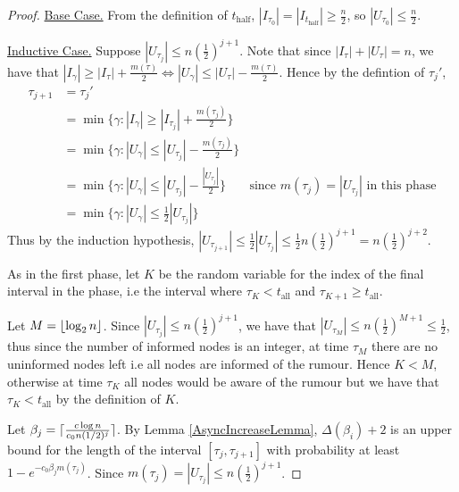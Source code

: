\begin{proof}
	\underline{Base Case.}
	From the definition of $t_\text{half}$, $|I_{\tau_0}| = |I_{t_\text{half}}| \geq \frac{n}{2}$, so $|U_{\tau_0}| \leq \frac{n}{2}$.

	\underline{Inductive Case.} Suppose $|U_{\tau_j}| \leq n(\frac{1}{2})^{j+1}$. Note that since $|I_\tau| + |U_\tau| = n$, we have that $|I_{\gamma}| \geq |I_\tau| + \frac{m(\tau)}{2} \iff |U_\gamma| \leq |U_\tau| - \frac{m(\tau)}{2}$. Hence by the defintion of $\tau_j'$,
	\begin{align*}
		\tau_{j+1} &= \tau_j' \\
		&= \min \{ \gamma : |I_\gamma| \geq |I_{\tau_j}| + \frac{m(\tau_j)}{2}\} \\
		&= \min \{ \gamma : |U_\gamma| \leq |U_{\tau_j}| - \frac{m(\tau_j)}{2}\} \\
		&= \min \{ \gamma : |U_\gamma| \leq |U_{\tau_j}| - \frac{|U_{\tau_j}|}{2}\} & \text{since } m(\tau_j) = |U_{\tau_j}| \text{ in this phase} \\
		&= \min \{ \gamma : |U_\gamma| \leq \frac{1}{2}|U_{\tau_j}|\}
	\end{align*}
	Thus by the induction hypothesis, $|U_{\tau_{j+1}}| \leq \frac{1}{2}|U_{\tau_j}| \leq \frac{1}{2}n(\frac{1}{2})^{j+1} = n(\frac{1}{2})^{j+2}$.

	As in the first phase, let $K$ be the random variable for the index of the final interval in the phase, i.e the interval where $\tau_K < t_\text{all}$ and $\tau_{K+1} \geq t_\text{all}$.

	Let $M = \lfloor\log_2 n\rfloor$. Since $|U_{\tau_j}| \leq n(\frac{1}{2})^{j+1}$, we have that $|U_{\tau_M}| \leq n(\frac{1}{2})^{M+1} \leq \frac{1}{2}$, thus since the number of informed nodes is an integer, at time $\tau_M$ there are no uninformed nodes left i.e all nodes are informed of the rumour. Hence $K < M$, otherwise at time $\tau_K$ all nodes would be aware of the rumour but we have that $\tau_K < t_\text{all}$ by the definition of $K$.

	Let $\beta_j = \lceil\frac{c \log n}{c_0 n(1/2)^j}\rceil$. %
	By Lemma \ref{AsyncIncreaseLemma}, $\Delta(\beta_i) + 2$ is an upper bound for the length of the interval $[\tau_j, \tau_{j+1}]$ 
	with probability at least $1 - e^{-c_0\beta_j m(\tau_j)}$. %
	Since $m(\tau_j) = |U_{\tau_j}| \leq n(\frac{1}{2})^{j+1}$.

\end{proof}

